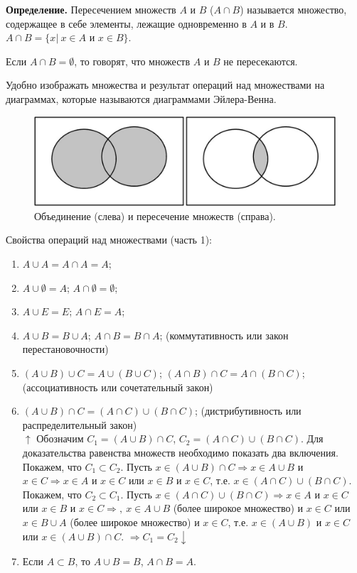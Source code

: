 \documentclass{article}
\begin{document}
    \textbf{Определение.} Пересечением множеств $A$ и $B$ ($A \cap B$) называется множество, содержащее в себе элементы, лежащие одновременно в $A$ и в $B$. $A \cap B = \{x|\ x \in A \textrm{ и } x \in B\}$.
    
    Если $A \cap B = \emptyset$, то говорят, что множеств $A$ и $B$ не пересекаются.  

    Удобно изображать множества и результат операций над множествами на диаграммах, которые называются диаграммами Эйлера-Венна. 

    \begin{figure}[h!]
    \centering
    \includegraphics{1}
    \caption{\label{fig:fig1}Объединение (слева) и пересечение множеств (справа).}
    \end{figure}

    Свойства операций над множествами (часть 1):

    \begin{enumerate}
        \item $A \cup A = A \cap A = A$;
        \item $A \cup \emptyset = A$; $A \cap \emptyset = \emptyset$;
        \item $A \cup E = E$; $A \cap E = A$;
        \item $A \cup B = B \cup A$; $A \cap B = B \cap A$; (коммутативность или закон перестановочности)
        \item $(A \cup B) \cup C = A \cup (B \cup C)$; $(A \cap B) \cap C = A \cap (B \cap C)$; (ассоциативность или сочетательный закон)
        \item $(A \cup B) \cap C = (A \cap C) \cup (B \cap C)$; (дистрибутивность или распределительный закон)\\
        $\uparrow$ Обозначим $C_1 = (A \cup B) \cap C$, $C_2 = (A \cap C) \cup (B \cap C)$. Для доказательства равенства множеств необходимо показать два включения.\\
        Покажем, что $C_1 \subset C_2$. Пусть $x \in (A \cup B) \cap C \Rightarrow x \in A \cup B$ и $x \in C \Rightarrow x \in A$ и $x \in C$ или $x \in B$ и $x \in C$, т.е. $x \in (A \cap C) \cup (B \cap C)$.\\
        Покажем, что $C_2 \subset C_1$. Пусть $x \in (A \cap C) \cup (B \cap C) \Rightarrow x \in A$ и $x \in C$ или $x \in B$ и $x \in C \Rightarrow,\ x \in A \cup B$ (более широкое множество) и $x \in C$ или $x \in B \cup A$ (более широкое множество) и $x \in C$, т.е. $x \in (A \cup B)$ и $x \in C$ или $x \in (A \cup B) \cap C$.
        $\Rightarrow C_1 = C_2 \downarrow$
        \item Если $A \subset B$, то $A \cup B = B$, $A \cap B = A$. 
    \end{enumerate}
\end{document}
